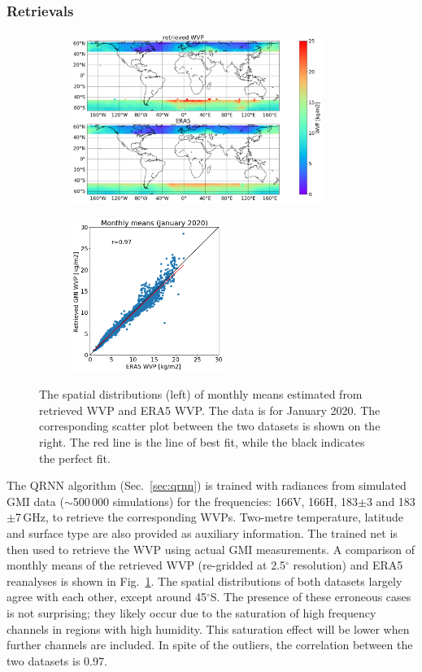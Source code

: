 \documentclass[12pt,oneside,a4paper]{article}
\begin{document}
\subsubsection{Retrievals}
\label{sec:preliminary_results}
\begin{figure}[t]
	\centering
	\begin{subfigure}{.54\textwidth}
		\includegraphics[height = 55mm]{Figures/WVP_spatial_jan2020.png}
	\end{subfigure}
	\begin{subfigure}{.34\textwidth}
	\includegraphics[height = 50mm]{Figures/WVP_scatter_monthlymean.png} 
	\end{subfigure}
	\caption{The spatial distributions (left) of monthly means estimated from retrieved WVP and ERA5 WVP. The data is for January 2020. The corresponding scatter plot between the two datasets is shown on the right. The red line is the line of best fit, while the black indicates the perfect fit.}
	\label{fig:WVP_retrievals}
\end{figure}

The QRNN algorithm (Sec.~\ref{sec:qrnn}) is trained with radiances from
simulated GMI data ($\sim$500\,000 simulations) for the frequencies: 166V,
166H, 183$\pm$3 and 183$\pm$7\,GHz, to retrieve the corresponding WVPs.
Two-metre temperature, latitude and surface type are also provided as auxiliary
information. The trained net is then used to retrieve the WVP using actual GMI
measurements. A comparison of monthly means of the retrieved WVP (re-gridded at
2.5$^{\circ}$ resolution) and ERA5 reanalyses is shown in
Fig.~\ref{fig:WVP_retrievals}. The spatial distributions of both datasets
largely agree with each other, except around 45$^{\circ}$S. The presence of
these erroneous cases is not surprising; they likely occur due to the
saturation of high frequency channels in regions with high humidity. This
saturation effect will be lower when further channels are included. In spite of
the outliers, the correlation between the two datasets is 0.97.
\end{document}
